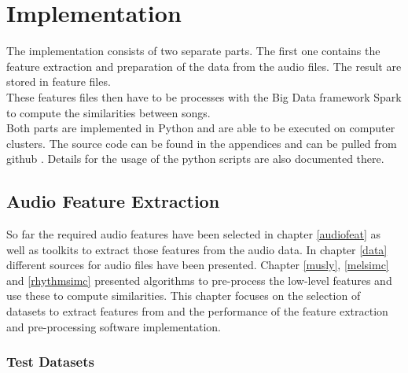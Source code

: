 
\chapter{Implementation}

The implementation consists of two separate parts. The first one contains the feature extraction and preparation of the data from the audio files. The result are stored in feature files.\\
These features files then have to be processes with the Big Data framework Spark to compute the similarities between songs.\\ 
Both parts are implemented in Python and are able to be executed on computer clusters. The source code can be found in the appendices and can be pulled from github \cite{github-code}. Details for the usage of the python scripts are also documented there. 

\section{Audio Feature Extraction}\label{simmet}

So far the required audio features have been selected in chapter \ref{audiofeat} as well as toolkits to extract those features from the audio data.
In chapter \ref{data} different sources for audio files have been presented. Chapter \ref{musly}, \ref{melsimc} and \ref{rhythmsimc} presented algorithms to pre-process the low-level features and use these to compute similarities. 
This chapter focuses on the selection of datasets to extract features from and the performance of the feature extraction and pre-processing software implementation.  

\subsection{Test Datasets}

